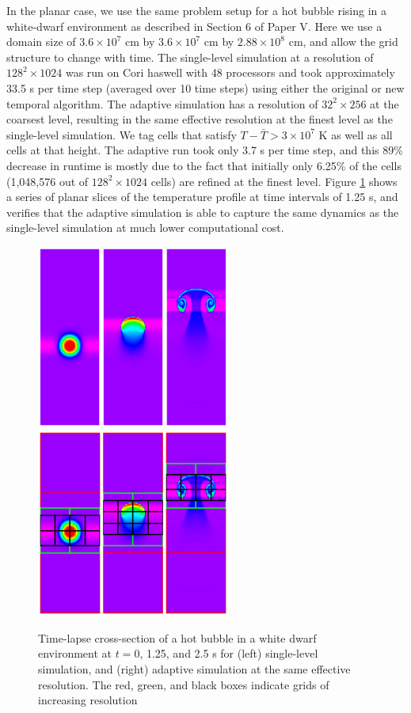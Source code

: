 \documentclass{aastex62}
\begin{document}
In the planar case, we use the same problem setup for a hot bubble rising in a white-dwarf environment as described in Section 6 of Paper V. Here we use a domain size of $3.6\times 10^7$ cm by $3.6\times 10^7$ cm by $2.88\times 10^8$ cm, and allow the grid structure to change with time. The single-level simulation at a resolution of $128^2 \times 1024$ was run on Cori haswell with 48 processors and took approximately 33.5 s per time step (averaged over 10 time steps) using either the original or new temporal algorithm. The adaptive simulation has a resolution of $32^2 \times 256$ at the coarsest level, resulting in the same effective resolution at the finest level as the single-level simulation. We tag cells that satisfy $T-\bar{T} > 3\times 10^7$ K as well as all cells at that height. The adaptive run took only 3.7 s per time step, and this 89\% decrease in runtime is mostly due to the fact that initially only 6.25\% of the cells (1,048,576 out of $128^2 \times 1024$ cells) are refined at the finest level. Figure \ref{fig:bubble_results} shows a series of planar slices of the temperature profile at time intervals of 1.25 s, and verifies that the adaptive simulation is able to capture the same dynamics as the single-level simulation at much lower computational cost.

\begin{figure}[htb]
\begin{center}
\includegraphics[width=2.5in]{reacting_bubble_result.eps} \hspace{2.5em}
\includegraphics[width=2.5in]{reacting_bubble_amr_result.eps}
\caption{\label{fig:bubble_results} Time-lapse cross-section of a hot bubble in a white dwarf environment at
         $t = 0$, 1.25, and 2.5 s for (left) single-level simulation, and
         (right) adaptive simulation at the same effective resolution.  The red, green, and black boxes indicate grids of increasing resolution}
\end{center}
\end{figure}
\end{document}
